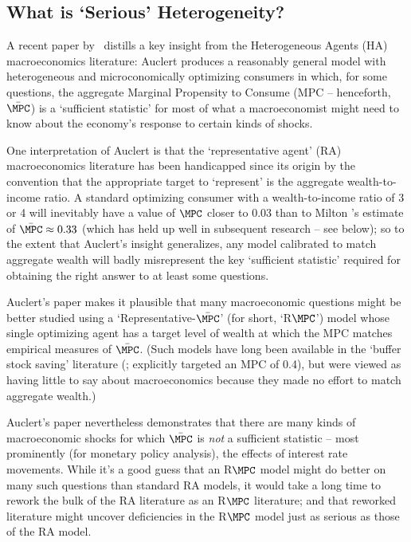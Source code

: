 \documentclass[titlepage]{econtex}
\begin{document}
\subsection{What is `Serious' Heterogeneity?}

A recent paper by~\cite{auclertMPC} distills a key insight from the Heterogeneous Agents (HA) macroeconomics literature:  Auclert produces a reasonably general model with heterogeneous and microconomically optimizing consumers in which, for some questions, the aggregate Marginal Propensity to Consume (MPC -- henceforth, $\bar{\MPC}$) is a `sufficient statistic' for most of what a macroeconomist might need to know about the economy's response to certain kinds of shocks.

One interpretation of Auclert is that the `representative agent' (RA) macroeconomics literature has been handicapped since its origin by the convention that the appropriate target to `represent' is the aggregate wealth-to-income ratio. A standard optimizing consumer with a wealth-to-income ratio of 3 or 4 will inevitably have a value of $\MPC$ closer to 0.03 than to Milton \cite{friedman:windfalls}'s estimate of $\bar{\MPC} \approx 0.33$ (which has held up well in subsequent research -- see below); so to the extent that Auclert's insight generalizes, any model calibrated to match aggregate wealth will badly misrepresent the key `sufficient statistic' required for obtaining the right answer to at least some questions.

Auclert's paper makes it plausible that many macroeconomic questions might be better studied using a `Representative-$\bar{\MPC}$' (for short, `R$\MPC$') model whose single optimizing agent has a target level of wealth at which the MPC matches empirical measures of $\bar{\MPC}$.  (Such models have long been available in the `buffer stock saving' literature (\cite{deatonLiqConstr}; \cite{carroll:bslcpih} explicitly targeted an MPC of 0.4), but were viewed as having little to say about macroeconomics because they made no effort to match aggregate wealth.)

Auclert's paper nevertheless demonstrates that there are many kinds of macroeconomic shocks for which $\bar{\MPC}$ is {\it not} a sufficient statistic -- most prominently (for monetary policy analysis), the effects of interest rate movements.  While it's a good guess that an R$\MPC$ model might do better on many such questions than standard RA models, it would take a long time to rework the bulk of the RA literature as an R$\MPC$ literature; and that reworked literature might uncover deficiencies in the R$\MPC$ model just as serious as those of the RA model.
\end{document}
